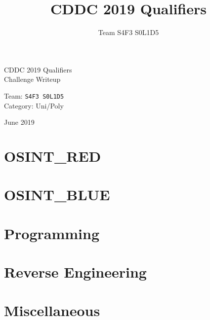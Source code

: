 \documentclass[12pt]{article}
\title{CDDC 2019 Qualifiers}
\author{Team S4F3 S0L1D5}
\begin{document}
\hypersetup{pageanchor=false}
\begin{center}

	\vspace*{5mm}

	\begin{flushleft}

	{
		\Roboto\fontsize{36pt}{48pt}\selectfont CDDC 2019 Qualifiers \\
		\Roboto\fontsize{28pt}{40pt}\selectfont Challenge Writeup

		\vfill

		\normalfont\fontsize{20pt}{24pt}\selectfont Team:    \tabto{30mm} \fontsize{24pt}{24pt}\selectfont \texttt{S4F3 S0L1D5} \\
		\normalfont\fontsize{20pt}{24pt}\selectfont Category:\tabto{30mm} Uni/Poly

		\vspace{5mm}
		\normalfont\fontsize{16pt}{20pt}\selectfont June 2019
		\vspace{30mm}
	}

	\end{flushleft}


\end{center}


\pagebreak
{}
\hypersetup{pageanchor=true}


\pagebreak\part{OSINT\_RED}


\pagebreak\part{OSINT\_BLUE}


\pagebreak\part{Programming}


\pagebreak\part{Reverse Engineering}


\pagebreak\part{Miscellaneous}


\end{document}
